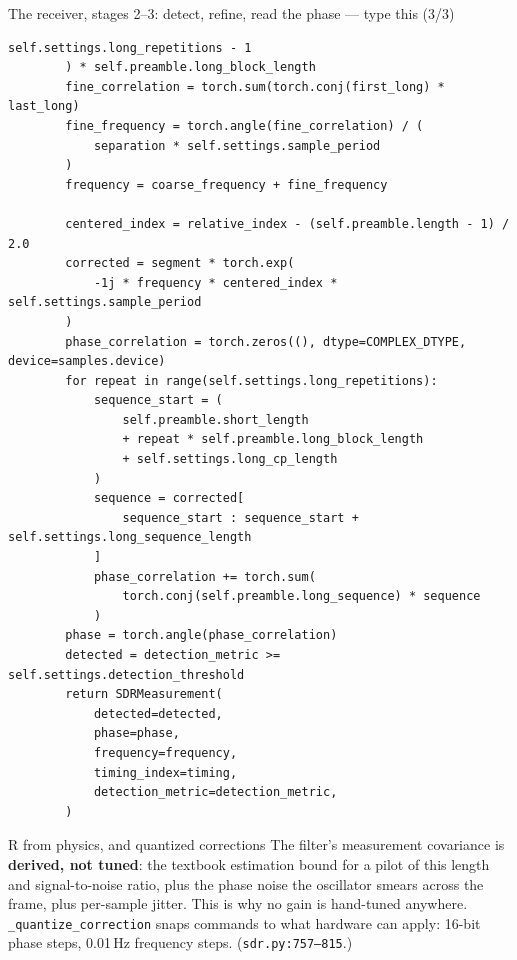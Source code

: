 \documentclass[10pt]{beamer}
\begin{document}
\begin{frame}[fragile]{The receiver, stages 2--3: detect, refine, read the phase --- type this (3/3)}
\begin{lstlisting}[basicstyle=\ttfamily\tiny]
            self.settings.long_repetitions - 1
        ) * self.preamble.long_block_length
        fine_correlation = torch.sum(torch.conj(first_long) * last_long)
        fine_frequency = torch.angle(fine_correlation) / (
            separation * self.settings.sample_period
        )
        frequency = coarse_frequency + fine_frequency

        centered_index = relative_index - (self.preamble.length - 1) / 2.0
        corrected = segment * torch.exp(
            -1j * frequency * centered_index * self.settings.sample_period
        )
        phase_correlation = torch.zeros((), dtype=COMPLEX_DTYPE, device=samples.device)
        for repeat in range(self.settings.long_repetitions):
            sequence_start = (
                self.preamble.short_length
                + repeat * self.preamble.long_block_length
                + self.settings.long_cp_length
            )
            sequence = corrected[
                sequence_start : sequence_start + self.settings.long_sequence_length
            ]
            phase_correlation += torch.sum(
                torch.conj(self.preamble.long_sequence) * sequence
            )
        phase = torch.angle(phase_correlation)
        detected = detection_metric >= self.settings.detection_threshold
        return SDRMeasurement(
            detected=detected,
            phase=phase,
            frequency=frequency,
            timing_index=timing,
            detection_metric=detection_metric,
        )
\end{lstlisting}
\end{frame}

\begin{frame}{R from physics, and quantized corrections}
  The filter's measurement covariance is \textbf{derived, not
  tuned}: the textbook estimation bound for a pilot of this
  length and signal-to-noise ratio, plus the phase noise the
  oscillator smears across the frame, plus per-sample jitter.
  This is why no gain is hand-tuned anywhere.
  \texttt{\_quantize\_correction} snaps commands to what
  hardware can apply: 16-bit phase steps, 0.01\,Hz frequency
  steps. (\texttt{sdr.py:757--815}.)
\end{frame}
\end{document}
